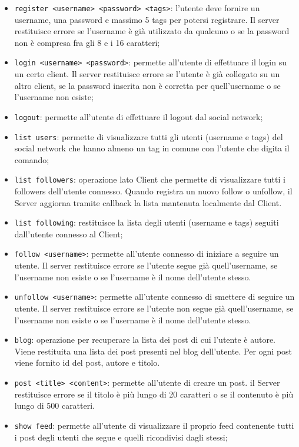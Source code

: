 \documentclass[11pt, a4paper, oneside]{article}
\begin{document}
\begin{itemize}
    \item \texttt{register <username> <password> <tags>}: l'utente deve fornire un username, una password e massimo 5 tags per potersi registrare. Il server restituisce errore
    se l'username è già utilizzato da qualcuno o se la password non è compresa fra gli 8 e i 16 caratteri;
    \item \texttt{login <username> <password>}: permette all'utente di effettuare il login su un certo client. Il server restituisce errore se l'utente è già collegato
    su un altro client, se la password inserita non è corretta per quell'username o se l'username non esiste;
    \item \texttt{logout}: permette all'utente di effettuare il logout dal social network;
    \item \texttt{list users}: permette di visualizzare tutti gli utenti (username e tags) del social network che hanno almeno un tag in comune con l'utente che digita il comando;
    \item \texttt{list followers}: operazione lato Client che permette di visualizzare tutti i followers dell'utente connesso. Quando registra un nuovo follow o unfollow, il Server
    aggiorna tramite callback la lista mantenuta localmente dal Client.
    \item \texttt{list following}: restituisce la lista degli utenti (username e tags) seguiti dall'utente connesso al Client;
    \item \texttt{follow <username>}: permette all'utente connesso di iniziare a seguire un utente. Il server restituisce errore se l'utente segue già
    quell'username, se l'username non esiste o se l'username è il nome dell'utente stesso.
    \item \texttt{unfollow <username>}: permette all'utente connesso di smettere di seguire un utente. Il server restituisce errore se l'utente non segue già
    quell'username, se l'username non esiste o se l'username è il nome dell'utente stesso.
    \item \texttt{blog}: operazione per recuperare la lista dei post di cui l’utente è autore. Viene restituita una lista dei post presenti nel blog dell’utente. 
    Per ogni post viene fornito id del post, autore e titolo. 
    \item \texttt{post <title> <content>}: permette all'utente di creare un post. il Server restituisce errore se il titolo è più lungo di 20 caratteri o se il contenuto
    è più lungo di 500 caratteri.
    \item \texttt{show feed}: permette all'utente di visualizzare il proprio feed contenente tutti i post degli utenti che segue e quelli ricondivisi dagli stessi;

\end{itemize}
\end{document}
